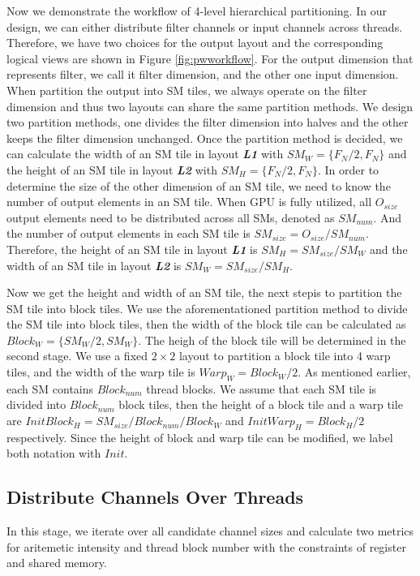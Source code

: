 Now we demonstrate the workflow of 4-level hierarchical partitioning.
In our design, we can either distribute filter channels or input channels across threads. 
Therefore, we have two choices for the output layout and the corresponding logical views are shown in Figure \ref{fig:pwworkflow}.
For the output dimension that represents filter, we call it filter dimension, and the other one input dimension.
When partition the output into SM tiles, we always operate on the filter dimension and thus two layouts can share the same partition methods.
We design two partition methods, one divides the filter dimension into halves and the other keeps the filter dimension unchanged.
Once the partition method is decided, we can calculate the width of an SM tile in layout \textbf{\emph{L1}} with $SM_{W}=\{F_N/2,F_N\}$ and the height of an SM tile in layout \textbf{\emph{L2}} with $SM_{H}=\{F_N/2,F_N\}$.
In order to determine the size of the other dimension of an SM tile, we need to know the number of output elements in an SM tile.
When GPU is fully utilized, all $O_{size}$ output elements need to be distributed across all SMs, denoted as $SM_{num}$.
And the number of output elements in each SM tile is $SM_{size}=O_{size}/SM_{num}$.
Therefore, the height of an SM tile in layout \textbf{\emph{L1}} is $SM_{H}=SM_{size}/SM_W$ and the width of an SM tile in layout \textbf{\emph{L2}} is $SM_{W}=SM_{size}/SM_H$.

Now we get the height and width of an SM tile, {\color{red}the next step}is to partition the SM tile into block tiles.
We use the aforementationed partition method to divide the SM tile into block tiles, then the width of the block tile can be calculated as $Block_{W}=\{SM_W/2,SM_W\}$.
The heigh of the block tile will be determined in the second stage.
We use a fixed $2\times2$ layout to partition a block tile into 4 warp tiles, and the width of the warp tile is $Warp_{W}=Block_{W}/2$.
As mentioned earlier, each SM contains $Block_{num}$ thread blocks. 
We assume that each SM tile is divided into $Block_{num}$ block tiles, then the height of a block tile and a warp tile are $InitBlock_{H}=SM_{size}/Block_{num}/Block_{W}$ and $InitWarp_{H}=Block_{H}/2$ respectively. Since the height of block and warp tile can be modified, we label both notation with $Init$. 

\subsection{Distribute Channels Over Threads}
In this stage, we iterate over all candidate channel sizes and calculate two metrics for aritemetic intensity and thread block number with the constraints of register and shared memory.

